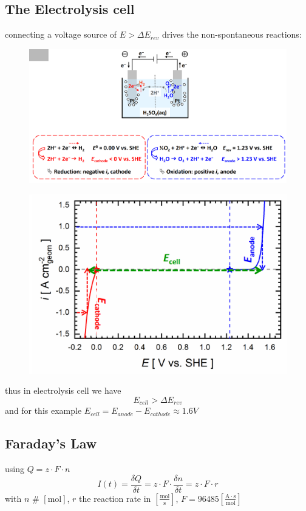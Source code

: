 \documentclass[a4paper,10pt,landscape]{scrartcl}
\begin{document}
\begin{multicols*}{3}
\subsection{The Electrolysis cell}
connecting a voltage source of $E>\Delta E_{rev}$ drives the non-spontaneous reactions:
\begin{figure}[H]
    \centering
    \includegraphics[width=\linewidth]{src/electrolysis_cell.png}
\end{figure}
\vspace{-.5cm}
\begin{figure}[H]
    \centering
    \includegraphics[width=.7\linewidth]{src/electrolysis_cell_pot.png}
\end{figure}
\vspace{-.5cm}
thus in electrolysis cell we have
$$E_{cell}>\Delta E_{rev}$$
and for this example $E_{cell}=E_{anode}-E_{cathode}\approx 1.6V$

\subsection{Faraday's Law}
using $Q=z\cdot F\cdot n$ 
$$I(t)=\frac{\delta Q}{\delta t}=z\cdot F\cdot \frac{\delta n}{\delta t}= z\cdot F\cdot r$$
with $n$ \# $[\mathrm{mol}]$, $r$ the reaction rate in $\left[\mathrm{\frac{mol}{s}}\right]$, $F=96 485 \left[\mathrm{\frac{A\cdot s}{mol}}\right]$ 

\end{multicols*}
\end{document}
